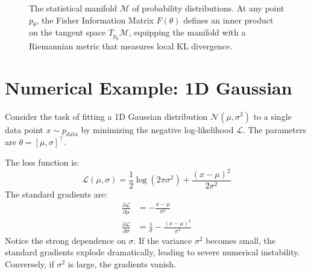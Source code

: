 \begin{figure}[ht]
\centering
{}
\caption{The statistical manifold $\mathcal{M}$ of probability distributions. At any point $p_\theta$, the Fisher Information Matrix $F(\theta)$ defines an inner product on the tangent space $T_{p_\theta}\mathcal{M}$, equipping the manifold with a Riemannian metric that measures local KL divergence.}
\label{fig:statistical_manifold}
\end{figure}

\section{Numerical Example: 1D Gaussian}
Consider the task of fitting a 1D Gaussian distribution $\mathcal{N}(\mu, \sigma^2)$ to a single data point $x \sim p_{\text{data}}$ by minimizing the negative log-likelihood $\mathcal{L}$. The parameters are $\theta = [\mu, \sigma]^\top$.

The loss function is:
\begin{equation}
    \mathcal{L}(\mu, \sigma) = \frac{1}{2}\log(2\pi\sigma^2) + \frac{(x - \mu)^2}{2\sigma^2}
\end{equation}
The standard gradients are:
\begin{align}
    \frac{\partial \mathcal{L}}{\partial \mu} &= -\frac{x - \mu}{\sigma^2} \\
    \frac{\partial \mathcal{L}}{\partial \sigma} &= \frac{1}{\sigma} - \frac{(x - \mu)^2}{\sigma^3}
\end{align}
Notice the strong dependence on $\sigma$. If the variance $\sigma^2$ becomes small, the standard gradients explode dramatically, leading to severe numerical instability. Conversely, if $\sigma^2$ is large, the gradients vanish.

